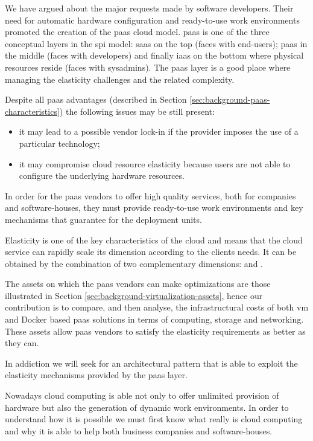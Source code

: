 We have argued about the major requests made by software developers. Their need for automatic
hardware configuration and ready-to-use work environments promoted the creation of the \ac{paas} 
cloud model. \ac{paas} is one of the three conceptual layers in the \ac{spi} model: \ac{saas} on the
top (faces with end-users); \ac{paas} in the middle (faces with developers) and finally \ac{iaas} on
the bottom where physical resources reside (faces with sysadmins). The \ac{paas} layer is a good place
where managing the elasticity challenges and the related complexity.


Despite all \ac{paas} advantages (described in Section \ref{sec:background-paas-characteristics})
the following issues may be still present:

\begin{itemize}
	\item{it may lead to a possible vendor lock-in if the provider imposes the use of a particular
		technology;}
	\item{it may compromise cloud resource elasticity because users are not able to configure the
		underlying hardware resources.}
\end{itemize}

In order for the \ac{paas} vendors to offer high quality services, both for companies and software-houses,
they must provide ready-to-use work environments and key mechanisms that guarantee 
for the deployment units.

Elasticity is one of the key characteristics of the cloud and means that the cloud service can rapidly
scale its dimension according to the clients needs. It can be obtained by the combination of two complementary
dimensions:  and .

The assets on which the \ac{paas} vendors can make optimizations are those illustrated in Section
\ref{sec:background-virtualization-assets}, hence our contribution is to compare, and then analyse, the
infrastructural costs of both \ac{vm} and Docker based \ac{paas} solutions in terms of computing, storage and
networking. These assets allow \ac{paas} vendors to satisfy the elasticity requirements as better as they can.

In addiction we will seek for an architectural pattern that is able to exploit the elasticity mechanisms 
provided by the \ac{paas} layer.

Nowadays cloud computing is able not only to offer unlimited provision of hardware but also the generation
of dynamic work environments. In order to understand how it is possible we must first know what really is
cloud computing and why it is able to help both business companies and software-houses.